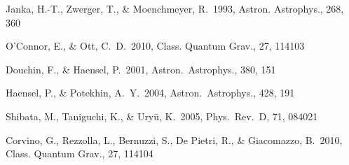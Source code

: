 \begin{thebibliography}{9}
 Janka, H.-T., Zwerger, T., \& Moenchmeyer, R.\ 1993, Astron. Astrophys., 268, 360 

 O'Connor, E., \& Ott, C.~D.\ 2010, Class. Quantum Grav., 27, 114103 

 Douchin, F., \& Haensel, P.\ 2001, Astron.~Astrophys., 380, 151 

 Haensel, P., \& Potekhin, A.~Y.\ 2004, Astron.~Astrophys., 428, 191 

 Shibata, M., Taniguchi, K., \& Ury{\= u}, K.\ 2005, Phys.~Rev.~D, 71, 084021 

 Corvino, G., Rezzolla, L., Bernuzzi, S., De Pietri, R., 
\& Giacomazzo, B.\ 2010, Class. Quantum Grav., 27, 114104 













\end{thebibliography}



